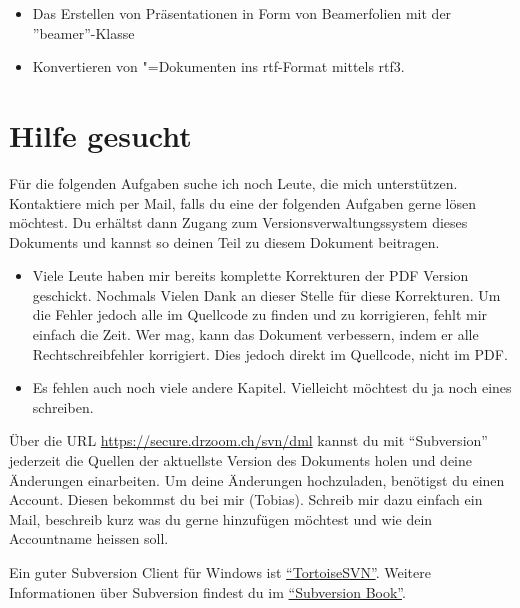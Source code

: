 \begin{itemize}
	\item Das Erstellen von Präsentationen in Form von Beamerfolien mit der ''beamer''-Klasse
	\item Konvertieren von \DMLLaTeX"=Dokumenten ins rtf-Format mittels rtf3\DMLLaTeX.
\end{itemize}

\section{Hilfe gesucht}
\label{sec:hilfe-gesucht}

Für die folgenden Aufgaben suche ich noch Leute, die mich unterstützen. Kontaktiere mich per Mail, falls du eine der folgenden Aufgaben gerne lösen möchtest. Du erhältst dann Zugang zum Versionsverwaltungssystem dieses Dokuments und kannst so deinen Teil zu diesem Dokument beitragen.

\begin{itemize}
	\item Viele Leute haben mir bereits komplette Korrekturen der PDF Version geschickt. Nochmals Vielen Dank an dieser Stelle für
	diese Korrekturen. Um die Fehler jedoch alle im Quellcode zu finden und zu korrigieren, fehlt mir einfach die Zeit. Wer mag, kann
	das Dokument verbessern, indem er alle Rechtschreibfehler korrigiert. Dies jedoch direkt im Quellcode, nicht im PDF.
	\item Es fehlen auch noch viele andere Kapitel. Vielleicht möchtest du ja noch eines schreiben.
\end{itemize}

Über die URL \href{https://secure.drzoom.ch/svn/dml}{https://secure.drzoom.ch/svn/dml} kannst du mit \enquote{Subversion} jederzeit die Quellen der aktuellste Version des Dokuments holen und deine Änderungen einarbeiten. Um deine Änderungen hochzuladen, benötigst du einen Account. Diesen bekommst du bei mir (Tobias). Schreib mir dazu einfach ein Mail, beschreib kurz was du gerne hinzufügen möchtest und wie dein Accountname heissen soll.

Ein guter Subversion Client für Windows ist \href{http://tortoisesvn.tigris.org/}{\enquote{TortoiseSVN}}. Weitere Informationen über Subversion findest du im \href{http://svnbook.red-bean.com/}{\enquote{Subversion Book}}.

